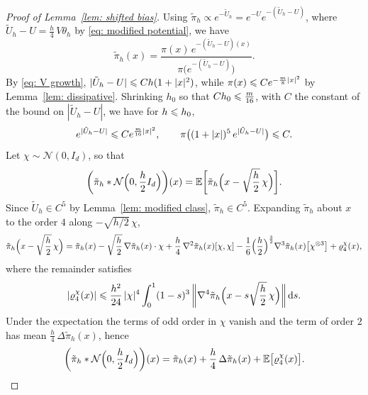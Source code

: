 \begin{proof}[Proof of Lemma~\ref{lem: shifted bias}]
    Using $\tilde\pi_h \propto e^{-\tilde U_h} = e^{-U} e^{-(\tilde U_h - U)}$, where $\tilde U_h - U = \frac h4\, V\theta_h$ by \eqref{eq: modified potential}, we have
    \begin{equation}
        \tilde\pi_h(x) = \frac{\pi(x)\, e^{-(\tilde U_h - U)(x)}}{\pi\bigl( e^{-(\tilde U_h - U)} \bigr)} .
        \label{eq: modified target ratio}
    \end{equation}
    By \eqref{eq: V growth}, $|\tilde U_h - U| \leqslant C h (1 + |x|^2)$, while $\pi(x) \leqslant C e^{-\frac{m}{8}|x|^2}$ by Lemma~\ref{lem: dissipative}. Shrinking $h_0$ so that $C h_0 \leqslant \frac{m}{16}$, with $C$ the constant of the bound on $|\tilde U_h - U|$, we have for $h \leqslant h_0$,
    \begin{equation}
        e^{|\tilde U_h - U|} \leqslant C e^{\frac{m}{16}|x|^2} , \qquad \pi\bigl( (1+|x|)^5\, e^{|\tilde U_h - U|} \bigr) \leqslant C .
        \label{eq: weighted moments}
    \end{equation}
    Let $\chi \sim \mathcal N(0,I_d)$, so that
    \begin{equation*}
        \biggl( \tilde\pi_h * \mathcal N\Bigl( 0, \frac h2 I_d \Bigr) \biggr)(x) = \mathbb E\biggl[ \tilde\pi_h\Bigl( x - \sqrt{\frac h2}\, \chi \Bigr) \biggr] .
    \end{equation*}
    Since $\tilde U_h \in C^5$ by Lemma~\ref{lem: modified class}, $\tilde\pi_h \in C^5$. Expanding $\tilde\pi_h$ about $x$ to the order $4$ along $-\sqrt{h/2}\, \chi$,
    \begin{equation*}
        \tilde\pi_h\Bigl( x - \sqrt{\frac h2}\, \chi \Bigr) = \tilde\pi_h(x) - \sqrt{\frac h2}\, \nabla \tilde\pi_h(x) \cdot \chi + \frac h4\, \nabla^2 \tilde\pi_h(x)[\chi,\chi] - \frac16 \Bigl( \frac h2 \Bigr)^{\frac32} \nabla^3\tilde\pi_h(x)\bigl[ \chi^{\otimes3} \bigr] + \varrho_4^{\chi}(x) ,
    \end{equation*}
    where the remainder satisfies
    \begin{equation}
        |\varrho_4^{\chi}(x)| \leqslant \frac{h^2}{24}\, |\chi|^4 \int_0^1 (1-s)^3\, \biggl\| \nabla^4 \tilde\pi_h\Bigl( x - s\sqrt{\frac h2}\, \chi \Bigr) \biggr\| \,\mathrm{d} s .
        \label{eq: fourth remainder}
    \end{equation}
    Under the expectation the terms of odd order in $\chi$ vanish and the term of order $2$ has mean $\frac h4\, \Delta \tilde\pi_h(x)$, hence
    \begin{equation}
        \biggl( \tilde\pi_h * \mathcal N\Bigl( 0, \frac h2 I_d \Bigr) \biggr)(x) = \tilde\pi_h(x) + \frac h4\, \Delta \tilde\pi_h(x) + \mathbb E\bigl[ \varrho_4^{\chi}(x) \bigr] .

\end{equation}
\end{proof}
